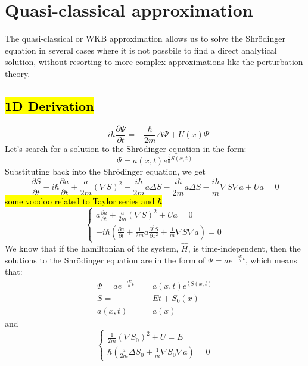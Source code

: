 \section{Quasi-classical approximation}
	The quasi-classical or WKB approximation allows us to solve the Shr\"odinger equation in several cases where it is not possbile to find a direct analytical solution, without resorting to more complex approximations like the perturbation theory.
	
	\subsection{\hl{1D Derivation}}
		\begin{equation}
			-ih\frac{\partial\Psi}{\partial t} = -\frac{\hbar}{2m}\Delta\Psi + U(x)\Psi
		\end{equation}
		Let's search for a solution to the Shr\"odinger equation in the form:
		\begin{equation}
			\Psi = a(x, t)e^{\frac{i}{\hbar}S(x,t)}
		\end{equation}
		Substituting back into the Shr\"odinger equation, we get
		\begin{equation}
			\frac{\partial S}{\partial t} - i \hbar \frac{\partial a}{\partial t} + \frac{a}{2m}(\nabla S)^2 - \frac{i\hbar}{2 m}a\Delta S - \frac{i\hbar}{2m}a\Delta S -\frac{i\hbar}{m}\nabla S \nabla a + Ua = 0
		\end{equation}
		\hl{some voodoo related to Taylor series and $\hbar$}
		\begin{equation}
			\left\{\begin{aligned}
				a \frac{\partial a}{\partial t} + \frac{a}{2m}(\nabla S)^2 + Ua= 0\\
				-i\hbar \left(\frac{\partial a}{\partial t} + \frac{1}{2m}a\frac{\partial^2S}{\partial x^2} + \frac{1}{m}\nabla S\nabla a\right)= 0
			\end{aligned}\right.
		\end{equation}
		We know that if the hamiltonian of the system, $\hat{H}$, is time-independent, then the solutions to the Shr\"odinger equation are in the form of $\Psi = a e ^ {-\frac{iE}{\hbar}t}$, which means that:
		\begin{align}
			\Psi = a e ^ {-\frac{iE}{\hbar}t} =& a(x, t)e^{\frac{i}{\hbar}S(x,t)} \\
			S =& Et + S_0(x) \\
			a(x, t) =& a(x)
		\end{align}
		and
		\begin{equation}
			\left\{\begin{aligned}
				\frac{1}{2m}(\nabla S_0)^2 + U = E \\
				\hbar\left(\frac{a}{2m}\Delta S_0 + \frac{1}{m}\nabla S_0\nabla a\right) = 0
			\end{aligned}\right.
		\end{equation}		

